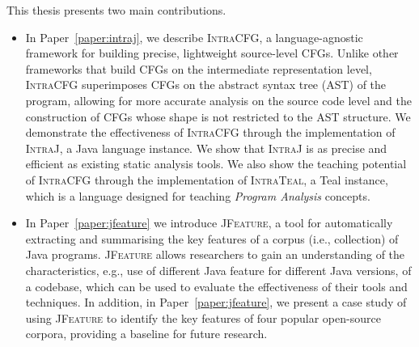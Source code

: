 This thesis presents two main contributions.
\begin{itemize}
	\item In Paper~\ref{paper:intraj},  we describe \textsc{IntraCFG}, a language-agnostic framework for building
	precise, lightweight source-level CFGs. Unlike other frameworks that
	build CFGs on the intermediate representation level, \textsc{IntraCFG} superimposes
	CFGs on the abstract syntax tree (AST) of the program, allowing for more accurate
	analysis on the source code level and the construction of CFGs whose shape is not
	restricted to the AST structure. We demonstrate the effectiveness
	of \textsc{IntraCFG} through the implementation of \textsc{IntraJ}, a Java language
	instance. We show that \textsc{IntraJ} is as precise and efficient as existing
	static analysis tools. We also show the teaching potential of \textsc{IntraCFG}
	through the implementation of \textsc{IntraTeal}, a Teal instance, which
	is a language designed for teaching \emph{Program Analysis} concepts.
	\item In Paper~\ref{paper:jfeature} we introduce \textsc{JFeature}, a tool for automatically extracting and summarising
	the key features of a corpus (i.e., collection) of Java programs. \textsc{JFeature}
	allows researchers to gain an understanding of the characteristics, e.g.,
	use of different Java feature for different Java versions, of a codebase,
	which can be used to evaluate the effectiveness of their tools and techniques.
	In addition, in Paper~\ref{paper:jfeature}, we present a case study of using \textsc{JFeature} to
	identify the key features of four popular open-source corpora, providing a
	baseline for future research.
\end{itemize}


